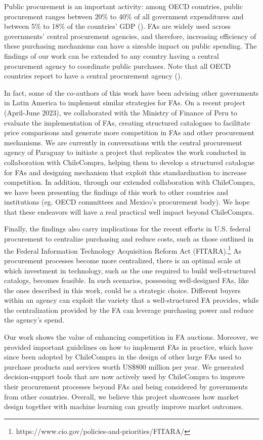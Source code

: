 Public procurement is an important activity: among OECD countries, public procurement ranges between 20\% to 40\% of all government expenditures and between 5\% to 18\% of the countries' GDP (\cite{OECD2017_PP}). FAs are widely used across governments' central procurement agencies, and therefore, increasing efficiency of these purchasing mechanisms can have a sizeable impact on public spending. The findings of our work can be extended to any country having a central procurement agency to coordinate public purchases. Note that all OECD countries report to have a central procurement agency (\cite{OECD2015_CPB}).

In fact, some of the co-authors of this work have been advising other governments in Latin America to implement similar strategies for FAs. On a recent project (April-June 2023), we collaborated with the Ministry of Finance of Peru to evaluate the implementation of FAs, creating structured catalogues to facilitate price comparisons and generate more competition in FAs and other procurement mechanisms. We are currently in conversations with the central procurement agency of Paraguay to initiate a project that replicates the work conducted in collaboration with ChileCompra, helping them to develop a structured catalogue for FAs and designing mechanism that exploit this standardization to increase competition. In addition, through our extended collaboration with ChileCompra, we have been presenting the findings of this work to other countries and institutions (eg. OECD committees and Mexico's procurement body). We hope that these endeavors will have a real practical well impact beyond ChileCompra.

Finally, the findings also carry implications for the recent efforts in U.S. federal procurement to centralize purchasing and reduce costs, such as those outlined in the Federal Information Technology Acquisition Reform Act (FITARA).\footnote{https://www.cio.gov/policies-and-priorities/FITARA/} As procurement processes become more centralized, there is an optimal scale at which investment in technology, such as the one required to build well-structured catalogs,  becomes feasible. In such scenarios, possessing well-designed FAs, like the ones described in this work, could be a strategic choice. Different buyers within an agency can exploit the variety that a well-structured FA provides, while the centralization provided by the FA can leverage purchasing power and reduce the agency's spend.

 Our work shows the value of enhancing competition in FA auctions. Moreover, we provided important guidelines on how to implement FAs in practice, which have since been adopted by ChileCompra in the design of other large FAs used to purchase products and services worth US\$800 million per year. We generated decision-support tools that are now actively used by ChileCompra to improve their procurement processes beyond FAs and being considered by governments from other countries. Overall, we believe this project showcases how  market design together with machine learning can greatly improve market outcomes. 


